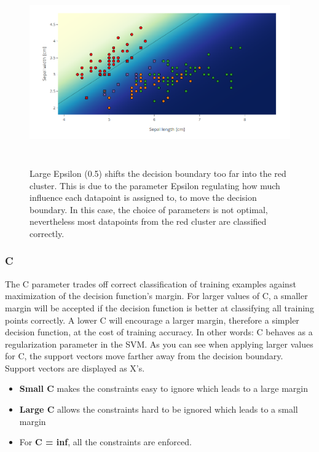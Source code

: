 \documentclass{scrartcl}
\begin{document}
\begin{figure}%
	\centering
	\includegraphics[height=8cm]{IrisLin51}
	\caption{Large Epsilon (0.5) shifts the decision boundary too far into the red cluster. This is due to the parameter Epsilon regulating how much influence each datapoint is assigned to, to move the decision boundary. In this case, the choice of parameters is not optimal, nevertheless most datapoints from the red cluster are classified correctly.}%
	\label{fig:example}%
\end{figure}
\newpage
\subsubsection*{C}
The C parameter trades off correct classification of training examples against maximization of the decision function’s margin. For larger values of C, a smaller margin will be accepted if the decision function is better at classifying all training points correctly. A lower C will encourage a larger margin, therefore a simpler decision function, at the cost of training accuracy. In other words: C behaves as a regularization parameter in the SVM. As you can see when applying larger values for C, the support vectors move farther away from the decision boundary. Support vectors are displayed as X's. 

\begin{itemize}
	\item \textbf{Small C} makes the constraints easy to ignore which leads to a large margin
	\item \textbf{Large C} allows the constraints hard to be ignored which leads to a small margin
	\item For \textbf{C = inf}, all the constraints are enforced.
\end{itemize}
\end{document}
